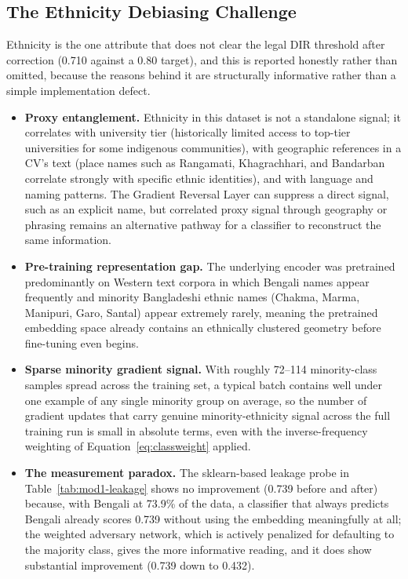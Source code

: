 \documentclass[11pt,a4paper]{article}
\begin{document}
\subsection{The Ethnicity Debiasing Challenge}
\label{sec:mod1-ethnicity}

Ethnicity is the one attribute that does not clear the legal DIR threshold after correction (0.710 against a 0.80 target), and this is reported honestly rather than omitted, because the reasons behind it are structurally informative rather than a simple implementation defect.

\begin{itemize}[leftmargin=1.4cm]
  \item \textbf{Proxy entanglement.} Ethnicity in this dataset is not a standalone signal; it correlates with university tier (historically limited access to top-tier universities for some indigenous communities), with geographic references in a CV's text (place names such as Rangamati, Khagrachhari, and Bandarban correlate strongly with specific ethnic identities), and with language and naming patterns. The Gradient Reversal Layer can suppress a direct signal, such as an explicit name, but correlated proxy signal through geography or phrasing remains an alternative pathway for a classifier to reconstruct the same information.
  \item \textbf{Pre-training representation gap.} The underlying encoder was pretrained predominantly on Western text corpora in which Bengali names appear frequently and minority Bangladeshi ethnic names (Chakma, Marma, Manipuri, Garo, Santal) appear extremely rarely, meaning the pretrained embedding space already contains an ethnically clustered geometry before fine-tuning even begins.
  \item \textbf{Sparse minority gradient signal.} With roughly 72--114 minority-class samples spread across the training set, a typical batch contains well under one example of any single minority group on average, so the number of gradient updates that carry genuine minority-ethnicity signal across the full training run is small in absolute terms, even with the inverse-frequency weighting of Equation~\ref{eq:classweight} applied.
  \item \textbf{The measurement paradox.} The sklearn-based leakage probe in Table~\ref{tab:mod1-leakage} shows no improvement (0.739 before and after) because, with Bengali at 73.9\% of the data, a classifier that always predicts Bengali already scores 0.739 without using the embedding meaningfully at all; the weighted adversary network, which is actively penalized for defaulting to the majority class, gives the more informative reading, and it does show substantial improvement (0.739 down to 0.432).
\end{itemize}
\end{document}
